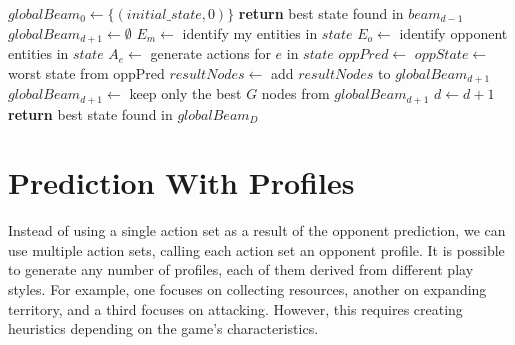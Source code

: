\documentclass[shortabstract, mgr, english]{iithesis}
\begin{document}
\begin{algorithm}
\caption{Nested Beam Search with Local Beam Opponent Prediction}
\label{alg:BeamSearchOpponentPrediction}
\begin{algorithmic}[1]
    \State $globalBeam_0 \gets \{(initial\_state, 0)\}$ 
            \State \textbf{return} best state found in $beam_{d-1}$
        \EndIf
        \State $globalBeam_{d+1} \gets \emptyset$
            \State $E_m \gets$ identify my entities in $state$
            \State $E_o \gets$ identify opponent entities in $state$
                \State $A_e \gets$ generate actions for $e$ in $state$
            \EndFor
            \State $oppPred \gets$ 
            \State $oppState \gets$ worst state from oppPred
            \State $resultNodes \gets$ 
            \State add $resultNodes$ to $globalBeam_{d+1}$
        \EndFor
        \State {}
            \State $globalBeam_{d+1} \gets$ keep only the best $G$ nodes from $globalBeam_{d+1}$
        \EndIf
        \State $d \gets d + 1$
    \EndFor
    \State \textbf{return} best state found in $globalBeam_D$
\EndProcedure
\end{algorithmic}
\end{algorithm}

\section{Prediction With Profiles}
\label{sec:PredictionWithProfiles}
Instead of using a single action set as a result of the opponent prediction, we can use multiple action sets, calling each action set an opponent profile. It is possible to generate any number of profiles, each of them derived from different play styles. For example, one focuses on collecting resources, another on expanding territory, and a third focuses on attacking. However, this requires creating heuristics depending on the game's characteristics. 
\end{document}
